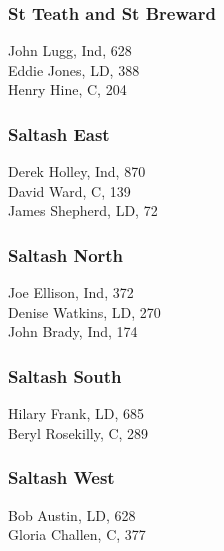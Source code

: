 \documentclass[a4paper,openany,10pt]{book}
\begin{document}
\subsubsection*{St Teath and St Breward}



John Lugg, Ind, 628\\
Eddie Jones, LD, 388\\
Henry Hine, C, 204\\


\subsubsection*{Saltash East}



Derek Holley, Ind, 870\\
David Ward, C, 139\\
James Shepherd, LD, 72\\


\subsubsection*{Saltash North}



Joe Ellison, Ind, 372\\
Denise Watkins, LD, 270\\
John Brady, Ind, 174\\


\subsubsection*{Saltash South}



Hilary Frank, LD, 685\\
Beryl Rosekilly, C, 289\\


\subsubsection*{Saltash West}



Bob Austin, LD, 628\\
Gloria Challen, C, 377\\
\end{document}
